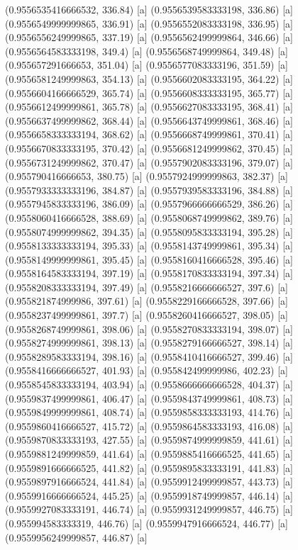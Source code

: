 {{{(0.9556535416666532, 336.84) [a] 
(0.9556539583333198, 336.86) [a] 
(0.9556549999999865, 336.91) [a] 
(0.9556552083333198, 336.95) [a] 
(0.9556556249999865, 337.19) [a] 
(0.9556562499999864, 346.66) [a] 
(0.9556564583333198, 349.4) [a] 
(0.9556568749999864, 349.48) [a] 
(0.955657291666653, 351.04) [a] 
(0.9556577083333196, 351.59) [a] 
(0.9556581249999863, 354.13) [a] 
(0.9556602083333195, 364.22) [a] 
(0.9556604166666529, 365.74) [a] 
(0.9556608333333195, 365.77) [a] 
(0.9556612499999861, 365.78) [a] 
(0.9556627083333195, 368.41) [a] 
(0.9556637499999862, 368.44) [a] 
(0.9556643749999861, 368.46) [a] 
(0.9556658333333194, 368.62) [a] 
(0.9556668749999861, 370.41) [a] 
(0.9556670833333195, 370.42) [a] 
(0.9556681249999862, 370.45) [a] 
(0.9556731249999862, 370.47) [a] 
(0.9557902083333196, 379.07) [a] 
(0.955790416666653, 380.75) [a] 
(0.9557924999999863, 382.37) [a] 
(0.9557933333333196, 384.87) [a] 
(0.9557939583333196, 384.88) [a] 
(0.9557945833333196, 386.09) [a] 
(0.9557966666666529, 386.26) [a] 
(0.9558060416666528, 388.69) [a] 
(0.9558068749999862, 389.76) [a] 
(0.9558074999999862, 394.35) [a] 
(0.9558095833333194, 395.28) [a] 
(0.9558133333333194, 395.33) [a] 
(0.9558143749999861, 395.34) [a] 
(0.9558149999999861, 395.45) [a] 
(0.9558160416666528, 395.46) [a] 
(0.9558164583333194, 397.19) [a] 
(0.9558170833333194, 397.34) [a] 
(0.9558208333333194, 397.49) [a] 
(0.9558216666666527, 397.6) [a] 
(0.955821874999986, 397.61) [a] 
(0.9558229166666528, 397.66) [a] 
(0.9558237499999861, 397.7) [a] 
(0.9558260416666527, 398.05) [a] 
(0.9558268749999861, 398.06) [a] 
(0.9558270833333194, 398.07) [a] 
(0.9558274999999861, 398.13) [a] 
(0.9558279166666527, 398.14) [a] 
(0.9558289583333194, 398.16) [a] 
(0.9558410416666527, 399.46) [a] 
(0.9558416666666527, 401.93) [a] 
(0.955842499999986, 402.23) [a] 
(0.9558545833333194, 403.94) [a] 
(0.9558666666666528, 404.37) [a] 
(0.9559837499999861, 406.47) [a] 
(0.9559843749999861, 408.73) [a] 
(0.9559849999999861, 408.74) [a] 
(0.9559858333333193, 414.76) [a] 
(0.9559860416666527, 415.72) [a] 
(0.9559864583333193, 416.08) [a] 
(0.9559870833333193, 427.55) [a] 
(0.9559874999999859, 441.61) [a] 
(0.9559881249999859, 441.64) [a] 
(0.9559885416666525, 441.65) [a] 
(0.9559891666666525, 441.82) [a] 
(0.9559895833333191, 441.83) [a] 
(0.9559897916666524, 441.84) [a] 
(0.9559912499999857, 443.73) [a] 
(0.9559916666666524, 445.25) [a] 
(0.9559918749999857, 446.14) [a] 
(0.9559927083333191, 446.74) [a] 
(0.9559931249999857, 446.75) [a] 
(0.955994583333319, 446.76) [a] 
(0.9559947916666524, 446.77) [a] 
(0.9559956249999857, 446.87) [a] 
}}}
